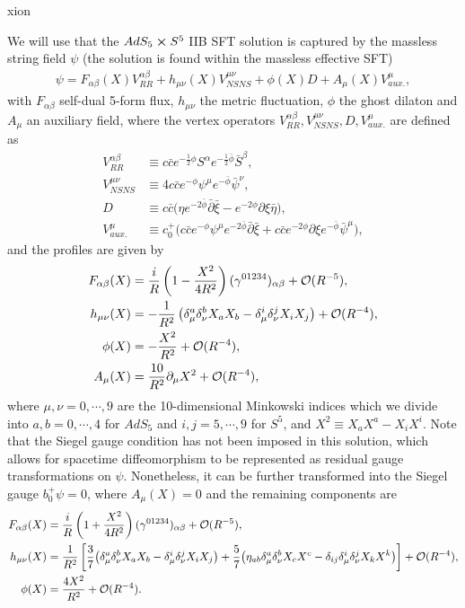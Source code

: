 xion\documentclass[12pt]{article}
\def\ie{\begin{equation}\begin{aligned}}
\def\fe{\end{aligned}\end{equation}}
\numberwithin{equation}{section}
\begin{document}
We will use that the $AdS_5 \cross S^5$ IIB SFT solution is captured by the massless string field $\psi$ (the solution is found within the massless effective SFT)
\ie\label{masslessansatzint}
    \psi = F_{\alpha \beta}(X) V^{\alpha\beta}_{RR}+ h_{\mu\nu}(X) V^{\mu \nu}_{NSNS} + \phi(X) D + A_{\mu}(X) V^\mu_{aux.},
\fe
with $F_{\alpha \beta}$ self-dual 5-form flux, $h_{\mu \nu}$ the metric fluctuation, $\phi$ the ghost dilaton and $A_\mu$ an auxiliary field,
where the vertex operators $V^{\alpha\beta}_{RR},V^{\mu \nu}_{NSNS},D, V^\mu_{aux.}$ are defined as
\ie\label{vertdefint}
    V^{\alpha \beta}_{RR} &\equiv c\bar{c} e^{-\frac{1}{2}\phi} S^\alpha e^{-\frac{1}{2}\bar{\phi}}\bar{S}^\beta ,
    \\
    V^{\mu \nu}_{NSNS} &\equiv 4c \bar{c} e^{-\phi} \psi^\mu e^{-\bar{\phi}}\bar{\psi}^\nu ,
    \\
    D & \equiv c\bar{c}\big(\eta e^{-2\bar{\phi}} \bar{\partial} \bar{\xi} - e^{-2\phi}\partial \xi \bar{\eta}\big) ,
    \\
    V^\mu_{aux.} &\equiv c_0^+\big(c \bar{c} e^{-\phi} \psi^\mu e^{-2\bar{\phi}}\bar{\partial}\bar{\xi} + c \bar{c} e^{-2\phi} \partial \xi e^{-\bar{\phi}} \bar{\psi}^\mu\big),
\fe
and the profiles are given by
\ie\label{covsol}
    F_{\alpha \beta}(X) &= {i\over R} \left( 1- {X^2\over 4R^2} \right) (\gamma^{01234})_{\alpha \beta} + {\cal O}(R^{-5}) ,
    \\
    h_{\mu \nu}(X) &=  -\frac{1}{R^2} \left(\delta^a_\mu \delta^b_\nu X_a X_b - \delta^i_\mu \delta^j_\nu X_i X_j \right) + {\cal O}(R^{-4}),
    \\
    \phi(X) &=  -\frac{X^2}{R^2} + {\cal O}(R^{-4}),
    \\
    A_\mu(X) &= \frac{10}{R^2} \partial_\mu X^2 + {\cal O}(R^{-4}),
\fe
where $\mu,\nu=0,\cdots,9$ are the 10-dimensional Minkowski indices which we divide into $a,b=0,\cdots,4$ for $AdS_5$ and $i,j=5,\cdots,9$ for $S^5$, and $X^2\equiv X_a X^a-X_i X^i$. Note that the Siegel gauge condition has not been imposed in this solution, which allows for spacetime diffeomorphism to be represented as residual gauge transformations on $\psi$. %
Nonetheless, it can be further transformed into the Siegel gauge $b_0^+\psi=0$, where $A_{\mu}(X)=0$ and the remaining components are
\ie\label{siegelsolution}
    F_{\alpha \beta}(X) &= {i\over R} \left( 1 + {X^2\over 4R^2} \right) (\gamma^{01234})_{\alpha \beta} + {\cal O}(R^{-5}),
    \\
   h_{\mu \nu}(X) &= {1\over R^2} \left[ \frac{3}{7} \big(\delta^a_\mu \delta^b_\nu X_a X_b - \delta^i_\mu \delta^j_\nu X_i X_j\big) +\frac{5}{7}\big(\eta_{ab}\delta_{\mu}^a\delta_{\nu}^bX_cX^c-\delta_{ij}\delta_{\mu}^i\delta_{\nu}^jX_kX^k\big) \right] + {\cal O}(R^{-4}),
   \\
    \phi(X)&= {4 X^2\over R^2} + {\cal O}(R^{-4}) .
\fe
\end{document}
